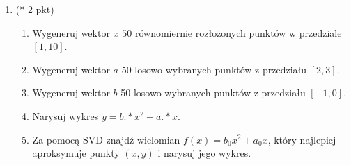 \documentclass[12pt,a4paper]{article}
\theoremstyle{definition}
\begin{document}
\begin{enumerate}
		\item (* 2 pkt)\begin{enumerate}
			\item Wygeneruj wektor $x$ $50$ równomiernie rozłożonych punktów w przedziale $[1,10]$.
			\item Wygeneruj wektor $a$ 50 losowo wybranych punktów z przedziału $[2,3]$.
			\item Wygeneruj wektor $b$ 50 losowo wybranych punktów z przedziału $[-1,0]$.
			\item Narysuj wykres $y=b.*x^2+a.*x$.
			\item Za pomocą SVD znajd\'z wielomian $f(x)=b_0x^2+a_0x$, który najlepiej aproksymuje punkty $(x,y)$ i narysuj jego wykres.
		\end{enumerate}
		
		
\end{enumerate}
\end{document}
